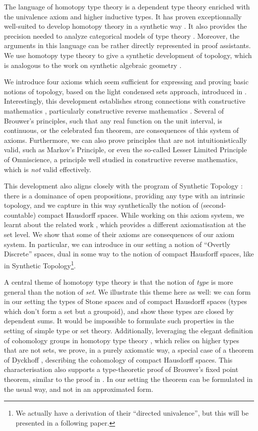 The language of homotopy type theory is a  dependent type theory enriched with the univalence axiom and higher inductive types. It has proven exceptionnally well-suited to
develop homotopy theory in a synthetic way \cite{hott}. It also provides
the precision needed to analyze categorical models of type theory \cite{vanderweide2024}.
Moreover, the arguments in this language can be rather directly represented in proof assistants. We use homotopy type theory to give a synthetic development of topology, which is analogous to the work on synthetic algebraic geometry \cite{draft}. 

We introduce 
four axioms which seem sufficient for expressing and proving basic notions of topology, based on the light condensed
sets approach, introduced in \cite{Scholze}.
Interestingly, this development establishes strong connections with constructive mathematics \cite{Bishop},
particularly constructive reverse mathematics \cite{ReverseMathsBishop,HannesDiener}. Several of Brouwer's principles, such that
any real function on the unit interval, is continuous, or the celebrated fan theorem, are consequences of this system
of axioms. Furthermore, we can also prove principles that are not intuitionistically valid, such as Markov's Principle,
or even the so-called Lesser Limited Principle of Omniscience, a principle well studied in constructive reverse mathematics,
which is {\em not} valid effectively.

This development also aligns closely with the program of Synthetic
Topology \cite{SyntheticTopologyEscardo,SyntheticTopologyLesnik}:
there is a dominance of open propositions, providing any type with an intrinsic
topology, and we capture in this way synthetically the notion of (second-countable) compact Hausdorff spaces.
While working on this axiom system, we learnt about the related work \cite{bc24}, which provides a different axiomatisation
at the set level. We show that some of their axioms are consequences of our axiom system. In particular, we can introduce
in our setting a notion of ``Overtly Discrete'' spaces, dual in some way to the notion of compact Hausforff spaces, like
in Synthetic Topology\footnote{We actually have a
derivation of their ``directed univalence'', but this will be presented in a following paper.}.

A central theme of homotopy type theory is that the notion of {\em type} is more general than the notion of {\em set}. We illustrate
this theme here as well: we can form in our setting the types of Stone spaces and of compact Hausdorff spaces
(types which don't form a set but a groupoid),
and show these types are
closed by dependent sums. It would be impossible to formulate such properties in the setting of simple type or set theory.
Additionally, leveraging the elegant definition of cohomology groups in homotopy type theory \cite{hott}, which relies
on higher types that are not sets, we prove, in a purely axiomatic way,
a special case of a theorem of Dyckhoff \cite{dyckhoff76}, describing
the cohomology of compact Hausdorff spaces. This characterisation also supports a type-theoretic proof of
Brouwer's fixed point theorem, similar to the proof in \cite{shulman-Brouwer-fixed-point}. In our setting the theorem can be formulated in the usual
way, and not in an approximated form.

